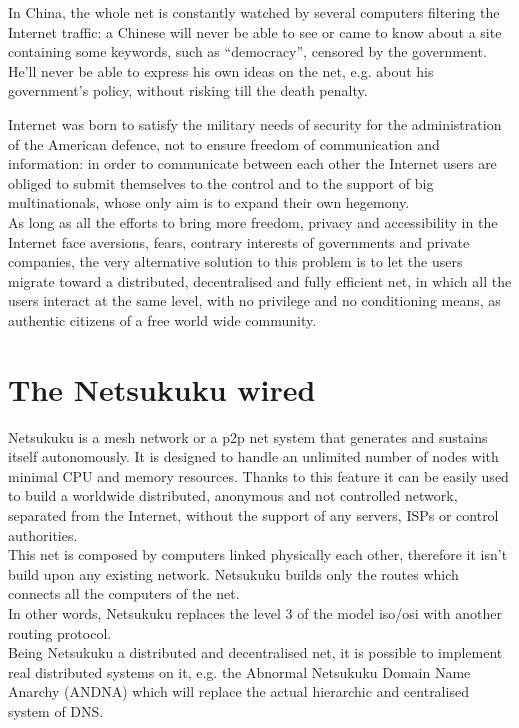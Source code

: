 \documentclass[a4paper]{article}
\begin{document}
In China, the whole net is constantly watched by several computers filtering
the Internet traffic: a Chinese will never be able to see or came to know
about a site containing some keywords, such as ``democracy'', censored by
the government. He'll never be able to express his own ideas on the net,
e.g. about his government's policy, without risking till the death
penalty.

Internet was born to satisfy the military needs of security for the
administration of the American defence, not to ensure freedom of
communication and information: in order to communicate between each other
the Internet users are obliged to submit themselves to the control and to
the support of big multinationals, whose only aim is to expand their own
hegemony.\\
As long as all the efforts to bring more freedom, privacy and accessibility
in the Internet face aversions, fears, contrary interests of governments and
private companies, the very alternative solution to this problem is to let
the users migrate toward a distributed, decentralised and fully efficient
net, in which all the users interact at the same level, with no privilege
and no conditioning means, as authentic citizens of a free world wide
community.

\section{The Netsukuku wired}

Netsukuku is a mesh network or a p2p net system that generates and sustains
itself autonomously. It is designed to handle an unlimited number of nodes
with minimal CPU and memory resources. Thanks to this feature it can be
easily used to build a worldwide distributed, anonymous and not controlled
network, separated from the Internet, without the support of any servers,
ISPs or control authorities.\\
This net is composed by computers linked physically each other, therefore
it isn't build upon any existing network. Netsukuku builds only the routes
which connects all the computers of the net.\\
In other words, Netsukuku replaces the level 3 of the model iso/osi with
another routing protocol.\\

Being Netsukuku a distributed and decentralised net, it is possible to
implement real distributed systems on it, e.g. the Abnormal Netsukuku Domain
Name Anarchy (ANDNA)\cite{andnadoc} which will replace the actual hierarchic
and centralised system of DNS.
\end{document}
